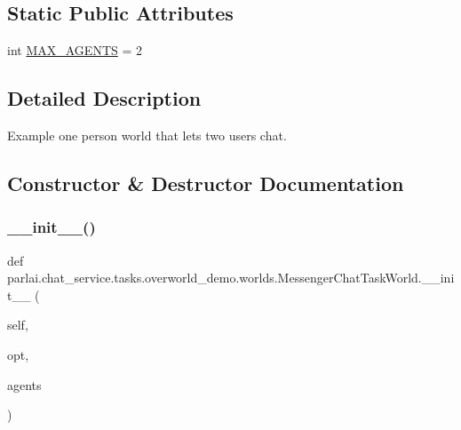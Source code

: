 \subsection*{Static Public Attributes}
\begin{DoxyCompactItemize}
\item 
int \hyperlink{classparlai_1_1chat__service_1_1tasks_1_1overworld__demo_1_1worlds_1_1MessengerChatTaskWorld_a8533513101dafbd8a6b980d6f10b8711}{M\+A\+X\+\_\+\+A\+G\+E\+N\+TS} = 2
\end{DoxyCompactItemize}


\subsection{Detailed Description}
\begin{DoxyVerb}Example one person world that lets two users chat.
\end{DoxyVerb}
 

\subsection{Constructor \& Destructor Documentation}
\mbox{\label{classparlai_1_1chat__service_1_1tasks_1_1overworld__demo_1_1worlds_1_1MessengerChatTaskWorld_a4092cb3b80c2af7884b5368db1803433}} 
\subsubsection{\texorpdfstring{\+\_\+\+\_\+init\+\_\+\+\_\+()}{\_\_init\_\_()}}
{\footnotesize\ttfamily def parlai.\+chat\+\_\+service.\+tasks.\+overworld\+\_\+demo.\+worlds.\+Messenger\+Chat\+Task\+World.\+\_\+\+\_\+init\+\_\+\+\_\+ (\begin{DoxyParamCaption}\item[{}]{self,  }\item[{}]{opt,  }\item[{}]{agents }\end{DoxyParamCaption})}



